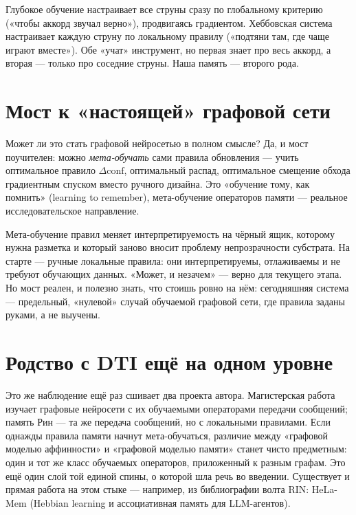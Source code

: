 \begin{intuition}
Глубокое обучение настраивает все струны сразу по глобальному критерию («чтобы
аккорд звучал верно»), продвигаясь градиентом. Хеббовская система настраивает
каждую струну по локальному правилу («подтяни там, где чаще играют вместе»). Обе
«учат» инструмент, но первая знает про весь аккорд, а вторая — только про соседние
струны. Наша память — второго рода.
\end{intuition}

\section{Мост к «настоящей» графовой сети}

Может ли это стать графовой нейросетью в полном смысле? Да, и мост
поучителен: можно \emph{мета-обучать} сами правила обновления — учить оптимальное
правило $\Delta\text{conf}$, оптимальный распад, оптимальное смещение обхода
градиентным спуском вместо ручного дизайна. Это «обучение тому, как помнить»
(learning to remember), мета-обучение операторов памяти — реальное
исследовательское направление.

\begin{pitfall}[Но не на старте]
Мета-обучение правил меняет интерпретируемость на чёрный ящик, которому нужна
разметка и который заново вносит проблему непрозрачности субстрата. На старте —
ручные локальные правила: они интерпретируемы, отлаживаемы и не требуют обучающих
данных. «Может, и незачем» — верно для текущего этапа. Но мост реален, и полезно
знать, что стоишь ровно на нём: сегодняшняя система — предельный, «нулевой» случай
обучаемой графовой сети, где правила заданы руками, а не выучены.
\end{pitfall}

\section{Родство с DTI ещё на одном уровне}

Это же наблюдение ещё раз сшивает два проекта автора. Магистерская работа изучает
графовые нейросети с их обучаемыми операторами передачи сообщений; память Рин —
та же передача сообщений, но с локальными правилами. Если однажды правила памяти
начнут мета-обучаться, различие между «графовой моделью аффинности» и «графовой
моделью памяти» станет чисто предметным: один и тот же класс обучаемых операторов,
приложенный к разным графам. Это ещё один слой той единой спины, о которой шла речь
во введении. Существует и прямая работа на этом стыке — например, из библиографии
волта RIN: HeLa-Mem (Hebbian learning и ассоциативная память для LLM-агентов).
